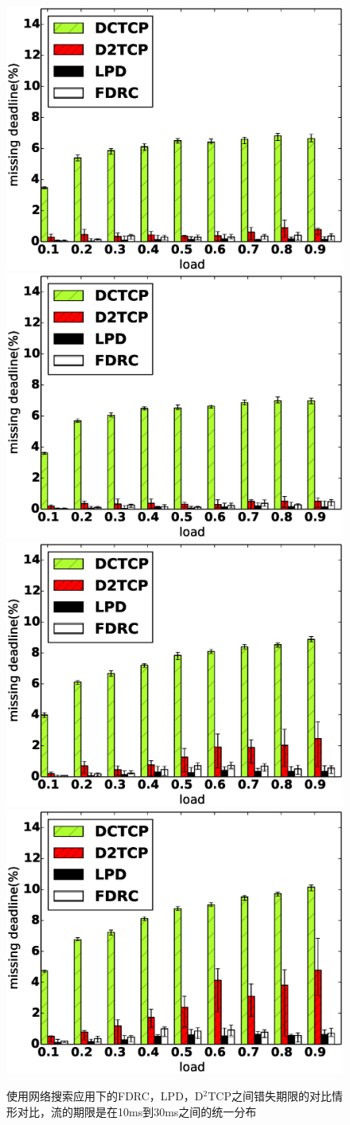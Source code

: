 \begin{figure}[h]
\setlength{\abovecaptionskip}{0pt} 
\setlength{\belowcaptionskip}{1pt} 
  \centering%
    {\includegraphics[width=0.5\columnwidth]{figures/FDRC/evaluation/spineleaf/miss_deadline_1.eps}}%
      {\includegraphics[width=0.5\columnwidth]{figures/FDRC/evaluation/spineleaf/miss_deadline_3.eps}}
    {\includegraphics[width=0.5\columnwidth]{figures/FDRC/evaluation/spineleaf/miss_deadline_7.eps}}%
      {\includegraphics[width=0.5\columnwidth]{figures/FDRC/evaluation/spineleaf/miss_deadline_10.eps}}
  \caption{使用网络搜索应用下的FDRC，LPD，D$^2$TCP之间错失期限的对比情形对比，流的期限是在10ms到30ms之间的统一分布}
  \label{fdrc-miss-spine-web-fig}
\end{figure}

